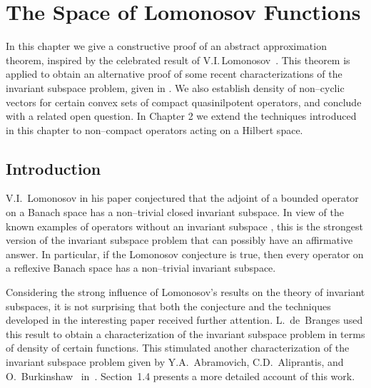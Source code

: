 \def\baselinestretch{1}

\chapter{The Space of Lomonosov Functions}

\def\baselinestretch{1.66}



In this chapter we give a constructive proof of an abstract
approximation theorem, inspired by the celebrated result of
V.I.\,Lomonosov~\cite{Lom73}. This theorem is applied to obtain
an alternative proof of some recent characterizations of the
invariant subspace problem, given in \cite{AAB95}. We also
establish density of non--cyclic vectors for certain convex
sets of compact quasinilpotent operators, and conclude with a
related open question. In Chapter 2 we extend the techniques
introduced in this chapter to non--compact operators acting on
a Hilbert space.

\smallskip

\goodbreak
\section{Introduction}

V.I.~Lomonosov in his paper \cite{Lom91} conjectured that the
adjoint of a bounded operator on a Banach space has a
non--trivial closed invariant subspace. In view of the known
examples of operators without an invariant subspace
\cite{Enf87,Rea85}, this is the strongest version of the
invariant subspace problem that can possibly have an
affirmative answer. In particular, if the Lomonosov conjecture
is true, then every operator on a reflexive Banach space has a
non--trivial invariant subspace.

\bigskip
\goodbreak

Considering the strong influence of Lomonosov's results on the
theory of invariant subspaces, it is not surprising that both
the conjecture and the techniques developed in the interesting
paper \cite{Lom91} received further attention. L.~de~Branges
used this result to obtain a characterization of the invariant
subspace problem in terms of density of certain functions. This
stimulated another characterization of the invariant subspace
problem given by Y.A.~Abramovich, C.D.~Aliprantis, and
O.~Burkinshaw ~in~\cite{AAB95}. Section~1.4 presents a more
detailed account of this work.

